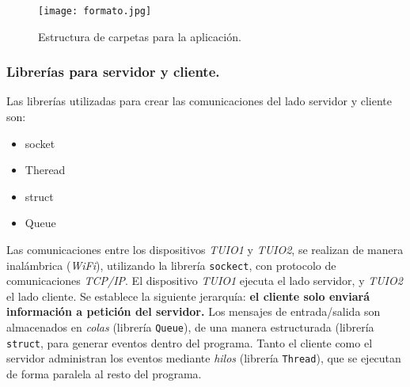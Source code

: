\begin{figure}[!h]
\begin{center}
\texttt{[image: formato.jpg]}
\caption{Estructura de carpetas para la aplicación.}
\label{fig:formato}
\end{center}
\end{figure}


\subsubsection{Librerías para servidor y cliente.}
Las librerías utilizadas para crear las comunicaciones del lado servidor y cliente son:
\begin{itemize}
\item socket
\item Theread
\item struct
\item Queue
\end{itemize}

Las comunicaciones entre los dispositivos \emph{TUIO1} y \emph{TUIO2}, se realizan de manera inalámbrica (\emph{WiFi}), utilizando la librería \texttt{sockect}, con protocolo de comunicaciones \emph{TCP/IP}.
El dispositivo \emph{TUIO1} ejecuta el lado servidor, y \emph{TUIO2} el lado cliente.
Se establece la siguiente jerarquía: \textbf{el cliente solo enviará información a petición del servidor.}
Los mensajes de entrada/salida son almacenados en \emph{colas} (librería \texttt{Queue}), de una manera estructurada (librería \texttt{struct}, para generar eventos dentro del programa.
Tanto el cliente como el servidor administran los eventos mediante \emph{hilos} (librería \texttt{Thread}), que se ejecutan de forma paralela al resto del programa.


